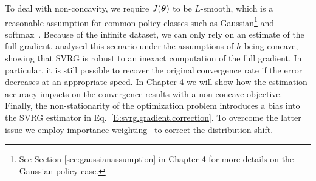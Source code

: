 To deal with non-concavity, we require $J(\boldsymbol{\theta})$ to be $L$-smooth, which is a reasonable assumption for common policy classes such as Gaussian\footnote{See Section \ref{sec:gaussianassumption} in \hyperref[chap:convergence]{Chapter 4} for more details on the Gaussian policy case.} and softmax~\citep[\eg][]{Furmston2012unifying,pirotta2015lipschitz}.
Because of the infinite dataset, we can only rely on an estimate of the full gradient.
\citet{harikandeh2015stopwasting} analysed this scenario under the assumptions of $h$ being concave, showing that \acs{SVRG} is robust to an inexact computation of the full gradient. In particular, it is still possible to recover the original convergence rate if the error decreases at an appropriate speed. In \hyperref[chap:convergence]{Chapter 4} we will show how the estimation accuracy impacts on the convergence results with a non-concave objective.
Finally, the non-stationarity of the optimization problem introduces a bias into the \acs{SVRG} estimator in Eq.~\eqref{E:svrg.gradient.correction}.
To overcome the latter issue we employ importance weighting~\citep[\eg][]{rubinstein1981simulation,precup2000eligibility} to correct the distribution shift.


